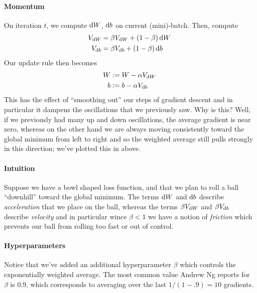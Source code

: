 \documentclass[12pt]{article}
\begin{document}
\paragraph{Momentum} On iteration $t$, we compute $\operatorname{d}\!{W}$, $\operatorname{d}\!{b}$ on current (mini)-batch. Then, compute
\begin{align*}
V_{\operatorname{d}\!{W}} &= \beta V_{\operatorname{d}\!{W}} + (1-\beta) \operatorname{d}\!{W} \\
V_{\operatorname{d}\!{b}} &= \beta V_{\operatorname{d}\!{b}} + (1-\beta) \operatorname{d}\!{b}
\end{align*}
Our update rule then becomes
\begin{align*}
W &:= W - \alpha V_{\operatorname{d}\!{W}} \\
b &:= b - \alpha V_{\operatorname{d}\!{b}}
\end{align*}
This has the effect of ``smoothing out'' our steps of gradient descent and in particular it dampens the oscillations that we previously saw. Why is this? Well, if we previously had many up and down oscillations, the average gradient is near zero, whereas on the other hand we are always moving consistently toward the global minimum from left to right and so the weighted average still pulls strongly in this direction; we've plotted this in \color{orange}{orange} \color{black} above.

\paragraph{Intuition} Suppose we have a bowl shaped loss function, and that we plan to roll a ball ``downhill'' toward the global minimum. The terms $\operatorname{d}\!{W}$ and $\operatorname{d}\!{b}$ describe \emph{acceleration} that we place on the ball, whereas the terms $\beta V_{\operatorname{d}\!{W}}$ and $\beta V_{\operatorname{d}\!{b}}$ describe \emph{velocity} and in particular wince 
$\beta < 1$ we have a notion of \emph{friction} which prevents
our ball from rolling too fast or out of control.

\paragraph{Hyperparameters} Notice that we've added an additional hyperparameter $\beta$ which controls the exponentially weighted average. The most common value Andrew Ng reports for $\beta$ is 
0.9, which corresponds to averaging over the last $1/(1-.9) = 10$ 
gradients.
\end{document}
